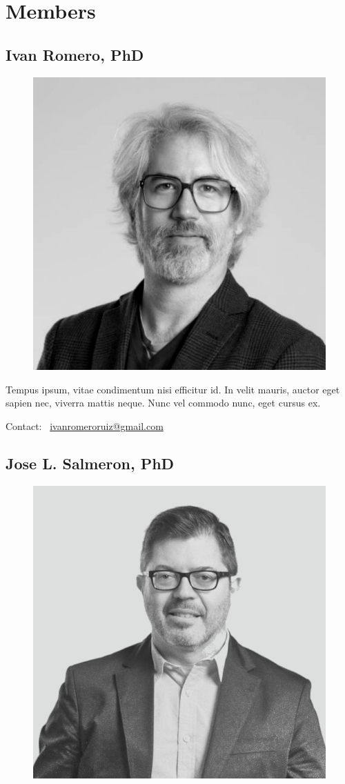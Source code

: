 \section{Members} \label{sec:team}

\subsection{Ivan Romero, PhD}

\begin{figure}[!ht]
  \centering
  \includegraphics[width=.25\textwidth]{../../img/team/romero.png}
  \caption{}
\end{figure}

{\small 
Tempus ipsum, vitae condimentum nisi efficitur id. In velit mauris, auctor eget
sapien nec, viverra mattis neque. Nunc vel commodo nunc, eget cursus ex.
}

Contact: \faEnvelope\ \href{mailto:ivanromeroruiz@gmail.com}{ivanromeroruiz@gmail.com}

\subsection{Jose L. Salmeron, PhD}

\begin{figure}[!ht]
  \centering
  \includegraphics[width=.25\textwidth]{../../img/team/salmeron.png}
  \caption{}
\end{figure}

